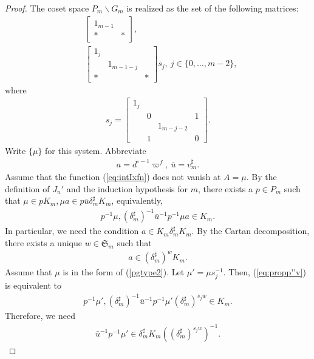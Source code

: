 \documentclass[11pt]{amsart}
\newcommand\Vp{\varpi}%
\newcommand\vp{\varphi}%
\newcommand\Sf{{\mathfrak{S}}}
\newcommand\1{\mathbf{1}}
\newcommand\bs{\backslash}%
\newcommand\bu{\bar{u}}
\numberwithin{equation}{section}
\begin{document}
\begin{proof}
The coset space $P_m \bs G_m$ is realized as the set of the following matrices:
\begin{align}
& \begin{bmatrix}
1_{m-1}&  \\
* & *
\end{bmatrix}, \label{pgtype1} \\
& \begin{bmatrix}
1_j & &  \\
& 1_{m-1-j}&  \\
* & & *
\end{bmatrix} s_j, \ j \in \{0, \ldots, m -2\}, \label{pgtype2}
\end{align}
where 
\begin{align}
s_j = \left[
\begin{array}{cccc}
1_{j} &   & & \\ 
   & 0 &  &1 \\
    & &1_{m-j-2} &  \\ 
  & 1  & & 0
\end{array}
\right]. \label{def:sj}
\end{align}  
Write $\{ \mu \}$ for this system.
Abbreviate 
\begin{align*}
a = d_{}^{\circ -1} \Vp^{f}, \ \bu = v_m^\sharp.
\end{align*}
Assume that the function (\ref{eq:intIxfn}) does not vanish at $A = \mu$.
By the definition of $J_n'$ and the induction hypothesis for $m$, there exists a $p \in P_{m}$ such that $\mu \in p K_m, \mu a \in p \bu \delta_m^\sharp  K_m$, equivalently, 
\begin{align}
p^{-1} \mu, (\delta_m^\sharp)^{-1} \bu^{-1} p^{-1} \mu a \in K_m. \label{eq:propp''v}
\end{align} 
In particular, we need the condition $a \in K_m \delta_m^\sharp K_m$.
By the Cartan decomposition, there exists a unique $w \in \Sf_m$ such that
\begin{align*}
a \in (\delta_m^\sharp)^w K_m.
\end{align*} 
Assume that $\mu$ is in the form of (\ref{pgtype2}).
Let $\mu' = \mu s_j^{-1}$.
Then, (\ref{eq:propp''v}) is equivalent to 
\begin{align*}
p^{-1} \mu', (\delta_m^\sharp)^{-1} \bu^{-1} p^{-1} \mu' (\delta_m^\sharp)^{s_j w} \in K_m.
\end{align*} 
Therefore, we need
\begin{align*}
\bu^{-1}  p^{-1} \mu' \in \delta_m^\sharp K_m ((\delta_m^\sharp)^{s_jw})^{-1}.

\end{align*}
\end{proof}
\end{document}
